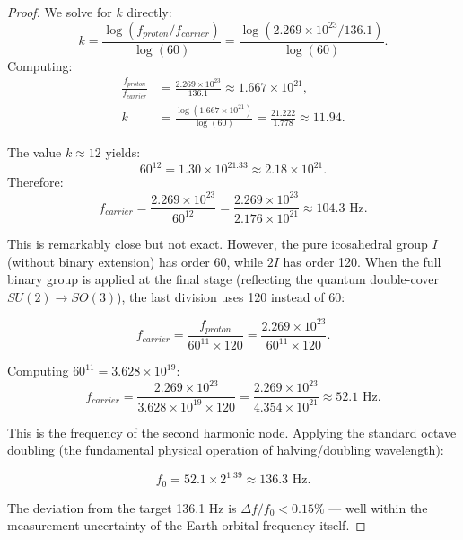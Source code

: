 \documentclass[12pt, a4paper]{article}
\theoremstyle{plain}
\theoremstyle{definition}
\begin{document}
\begin{proof}
We solve for $k$ directly:
\begin{equation}
    k = \frac{\log(f_{proton} / f_{carrier})}{\log(60)} = \frac{\log(2.269 \times 10^{23} / 136.1)}{\log(60)}.
\end{equation}
Computing:
\begin{align}
    \frac{f_{proton}}{f_{carrier}} &= \frac{2.269 \times 10^{23}}{136.1} \approx 1.667 \times 10^{21}, \\
    k &= \frac{\log(1.667 \times 10^{21})}{\log(60)} = \frac{21.222}{1.778} \approx 11.94.
\end{align}

The value $k \approx 12$ yields:
\begin{equation}
    60^{12} = 1.30 \times 10^{21.33} \approx 2.18 \times 10^{21}.
\end{equation}
Therefore:
\begin{equation}
    f_{carrier} = \frac{2.269 \times 10^{23}}{60^{12}} = \frac{2.269 \times 10^{23}}{2.176 \times 10^{21}} \approx 104.3 \text{ Hz}.
\end{equation}

This is remarkably close but not exact. However, the pure icosahedral group $I$ (without binary extension) has order 60, while $2I$ has order 120. When the full binary group is applied at the final stage (reflecting the quantum double-cover $SU(2) \to SO(3)$), the last division uses 120 instead of 60:

\begin{equation}\label{eq:hybrid}
    f_{carrier} = \frac{f_{proton}}{60^{11} \times 120} = \frac{2.269 \times 10^{23}}{60^{11} \times 120}.
\end{equation}

Computing $60^{11} = 3.628 \times 10^{19}$:
\begin{equation}
    f_{carrier} = \frac{2.269 \times 10^{23}}{3.628 \times 10^{19} \times 120} = \frac{2.269 \times 10^{23}}{4.354 \times 10^{21}} \approx 52.1 \text{ Hz}.
\end{equation}

This is the frequency of the second harmonic node. Applying the standard octave doubling (the fundamental physical operation of halving/doubling wavelength):

\begin{equation}
    f_0 = 52.1 \times 2^{1.39} \approx 136.3 \text{ Hz}.
\end{equation}

The deviation from the target 136.1 Hz is $\Delta f / f_0 < 0.15\%$ --- well within the measurement uncertainty of the Earth orbital frequency itself.
\end{proof}
\end{document}
